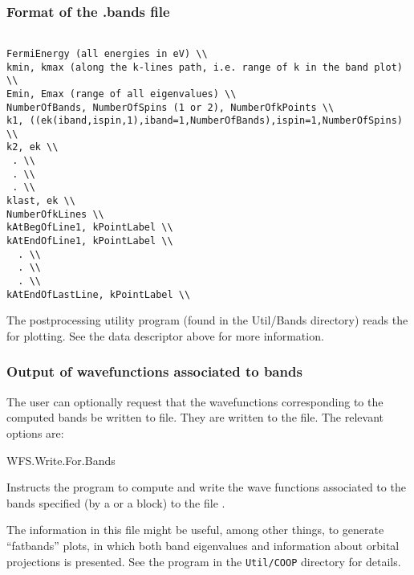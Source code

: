 \subsubsection{Format of the .bands file}

\begin{verbatim}

FermiEnergy (all energies in eV) \\
kmin, kmax (along the k-lines path, i.e. range of k in the band plot) \\
Emin, Emax (range of all eigenvalues) \\
NumberOfBands, NumberOfSpins (1 or 2), NumberOfkPoints \\
k1, ((ek(iband,ispin,1),iband=1,NumberOfBands),ispin=1,NumberOfSpins) \\
k2, ek \\
 . \\
 . \\
 . \\
klast, ek \\
NumberOfkLines \\
kAtBegOfLine1, kPointLabel \\
kAtEndOfLine1, kPointLabel \\
  . \\
  . \\
  . \\
kAtEndOfLastLine, kPointLabel \\
\end{verbatim}

\noindent
The  postprocessing
utility program (found in the Util/Bands directory) reads the
 for plotting.  See the  data
descriptor above for more information.


\subsubsection{Output of wavefunctions associated to bands}
\label{sec:wf-bands}

The user can optionally request that the wavefunctions corresponding
to the computed bands be written to file.  They are written to the
 file.
The relevant options are:

\begin{fdflogicalF}{WFS.Write.For.Bands}
  
  Instructs the program to compute and write the wave functions
  associated to the bands specified (by a  or a
   block) to the file .

  The information in this file might be useful, among other things, to
  generate ``fatbands'' plots, in which both band eigenvalues and
  information about orbital projections is presented.
   See the  program in the
  \texttt{Util/COOP} directory for details.

\end{fdflogicalF}

